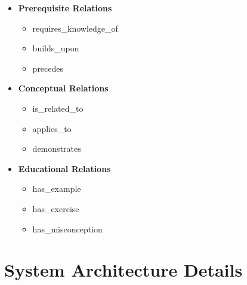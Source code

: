 \begin{itemize}
    \item \textbf{Prerequisite Relations}
        \begin{itemize}
            \item requires\_knowledge\_of
            \item builds\_upon
            \item precedes
        \end{itemize}
    \item \textbf{Conceptual Relations}
        \begin{itemize}
            \item is\_related\_to
            \item applies\_to
            \item demonstrates
        \end{itemize}
    \item \textbf{Educational Relations}
        \begin{itemize}
            \item has\_example
            \item has\_exercise
            \item has\_misconception
        \end{itemize}
\end{itemize}

\section{System Architecture Details}
\label{sec:system-architecture}

